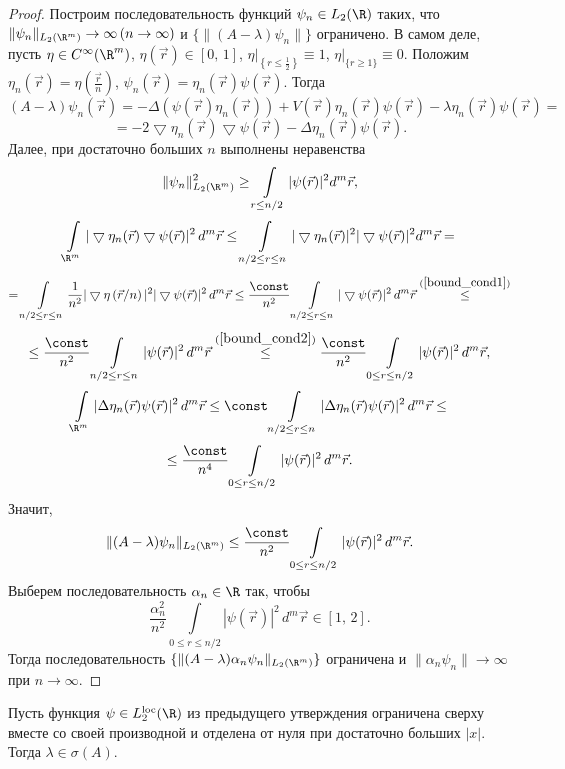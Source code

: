 \documentclass[a4paper
]{article}
\begin{document}
\begin{proof}
Построим последовательность функций $\psi_n\in L_2(\R)$ таких, что
$\|\psi_n\|_{L_2(\R^m)}\rightarrow \infty\, (n\rightarrow \infty)$ и
$\{\|(A-\lambda)\psi_n\|\}$ ограничено. В самом деле, пусть $\eta \in C^\infty
(\R^m)$, $\eta(\vec{r})\in [0, \, 1]$, $\eta|_{\left\{r\le \frac12\right\}}\equiv 1$,
$\eta|_{\{r\ge 1\}}\equiv 0$. Положим $\eta _n(\vec{r})=\eta\left(\frac
{\vec{r}}{n}\right)$, $\psi_n(\vec{r})=\eta_n(\vec{r})\psi(\vec{r})$.
Тогда $$(A-\lambda)\psi_n(\vec{r})=-\Delta(\psi(\vec{r})\eta_n(\vec{r}))+
V(\vec{r})\eta_n(\vec{r})\psi(\vec{r})-\lambda\eta_n(\vec{r})\psi(\vec{r})=$$
$$=-2\bigtriangledown \eta_n(\vec{r})\bigtriangledown \psi(\vec{r})-
\Delta \eta_n(\vec{r})\psi(\vec{r}).$$
Далее, при достаточно больших $n$ выполнены неравенства
$$\|\psi_n\|^2_{L_2(\R^m)}\ge \int \limits_{r\le n/2}|\psi(\vec{r})|^2
d^m\vec r,$$
$$\int \limits _{\R^m}|\bigtriangledown \eta_n(\vec{r})
\bigtriangledown \psi(\vec{r})|^2\, d^m\vec{r}\le \int \limits
_{n/2\le r\le n}|\bigtriangledown
\eta_n(\vec{r})|^2|\bigtriangledown \psi(\vec{r})|^2d^m\vec r=$$
$$=\int \limits _{n/2\le r \le n}\frac{1}{n^2}|\bigtriangledown \eta\left(\vec{r}/n\right)|^2
|\bigtriangledown\psi(\vec{r})|^2\, d^m\vec r\le \frac{\const}{n^2}\int
\limits _{n/2\le r\le n}|\bigtriangledown\psi(\vec r)|^2\, d^m\vec r\stackrel{(\ref{bound_cond1})}{\le} $$
$$\le \frac{\const}{n^2}\int \limits _{n/2\le r\le n}|\psi (\vec r)|^2\, d^m\vec r
\stackrel{(\ref{bound_cond2})}{\le}\frac{\const}{n^2}\int \limits_{0\le r\le n/2}|\psi(\vec{r})|^2\,
d^m\vec r,$$ $$\int \limits _{\R^m}|\Delta
\eta_n(\vec{r})\psi(\vec{r})|^2\, d^m\vec{r}\le \const \int
\limits _{n/2 \le r\le n}|\Delta \eta_n(\vec{r})\psi(\vec{r})|^2\,
d^m\vec r\le$$
$$\le \frac{\const}{n^4}\int \limits _{0\le r\le n/2}|\psi(\vec{r})|^2
\, d^m\vec r.$$ Значит, $$\|(A-\lambda)\psi_n\|_{L_2(\R^m)}\le \frac{\const}{n^2}
\int \limits _{0\le r\le n/2}|\psi(\vec{r})|^2\, d^m\vec r.$$ Выберем последовательность
$\alpha_n\in \R$ так, чтобы $$\frac{\alpha_n^2}{n^2}\int
\limits_{0\le r\le n/2}|\psi(\vec{r})|^2\, d^m\vec r\in [1, \,
2].$$ Тогда последовательность
$\{\|(A-\lambda)\alpha_n\psi_n\|_{L_2(\R^m)}\}$
ограничена и $\|\alpha_n\psi_n\|\rightarrow \infty$ при
$n\rightarrow \infty$.
\end{proof}
\begin{Cor}
\label{cor_bound}
Пусть функция $\psi\in L_2^{{\rm loc}}(\R)$ из предыдущего утверждения
ограничена сверху вместе со своей производной и отделена от нуля
при достаточно больших $|x|$. Тогда $\lambda\in \sigma(A)$.
\end{Cor}
\end{document}
